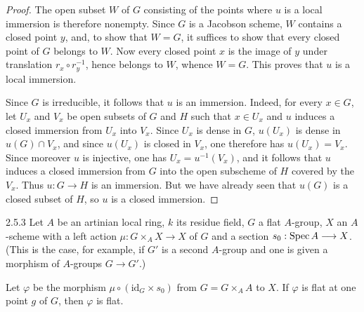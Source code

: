\begin{proof}
The open subset $W$ of $G$ consisting of the points where $u$ is a local immersion is therefore nonempty. Since $G$ is a Jacobson scheme, $W$ contains a closed point $y$, and, to show that $W=G$, it suffices to show that every closed point of $G$ belongs to $W$. Now every closed point $x$ is the image of $y$ under translation $r_x\circ r_y^{-1}$, hence belongs to $W$, whence $W=G$. This proves that $u$ is a local immersion.

Since $G$ is irreducible, it follows that $u$ is an immersion. Indeed, for every $x\in G$, let $U_x$ and $V_x$ be open subsets of $G$ and $H$ such that $x\in U_x$ and $u$ induces a closed immersion from $U_x$ into $V_x$. Since $U_x$ is dense in $G$, $u(U_x)$ is dense in $u(G)\cap V_x$, and since $u(U_x)$ is closed in $V_x$, one therefore has $u(U_x)=V_x$. Since moreover $u$ is injective, one has $U_x=u^{-1}(V_x)$, and it follows that $u$ induces a closed immersion from $G$ into the open subscheme of $H$ covered by the $V_x$. Thus $u:G\to H$ is an immersion. But we have already seen that $u(G)$ is a closed subset of $H$, so $u$ is a closed immersion.
\end{proof}
\begin{lemma}{2.5.3}\label{VIA.2.5.3}
Let $A$ be an artinian local ring, $k$ its residue field, $G$ a flat $A$-group, $X$ an $A$-scheme with a left action $\mu:G\times_AX\to X$ of $G$ and a section $s_0:\operatorname{Spec} A\longrightarrow X$. (This is the case, for example, if $G'$ is a second $A$-group and one is given a morphism of $A$-groups $G\to G'$.)

Let $\varphi$ be the morphism $\mu\circ(\mathrm{id}_G\times s_0)$ from $G=G\times_AA$ to $X$. If $\varphi$ is flat at one point $g$ of $G$, then $\varphi$ is flat.
\end{lemma}
